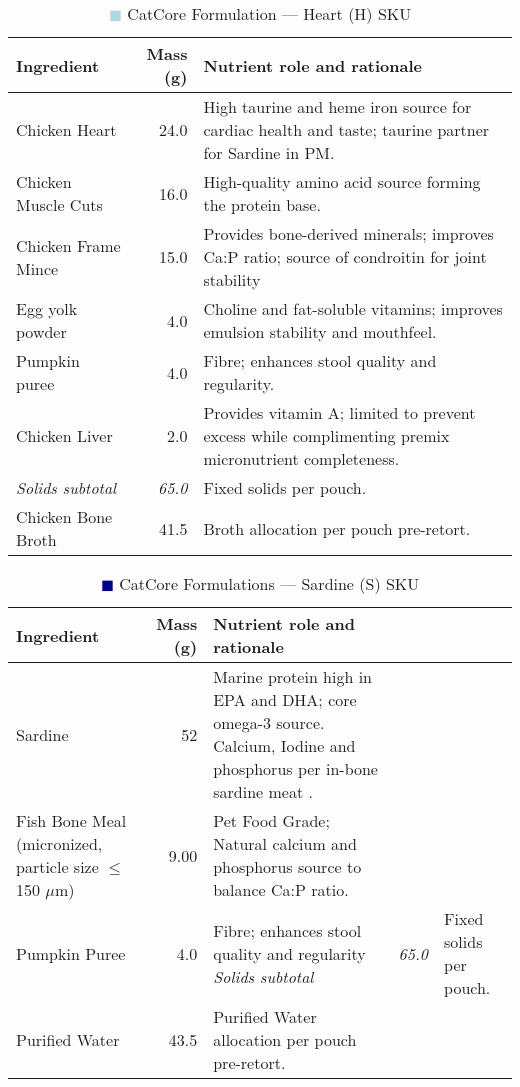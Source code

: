 \begin{table}[htbp]
\centering
\caption{\textcolor{lightblue}{$\blacksquare$} CatCore Formulation ---  Heart (H) SKU}
\label{tab:heart_sku_3col}
\begin{adjustbox}{max width=\textwidth}
\begin{tabular}{@{}l r p{8.0cm}@{}}
\toprule
\textbf{Ingredient} & \textbf{Mass (g)} & \textbf{Nutrient role and rationale} \\
\midrule
Chicken Heart & 24.0 & High taurine and heme iron source for cardiac health and taste; taurine partner for Sardine in PM. \\[3pt]
Chicken Muscle Cuts & 16.0 & High-quality amino acid source forming the protein base. \\[3pt]
Chicken Frame Mince & 15.0 & Provides bone-derived minerals; improves Ca:P ratio; source of condroitin for joint stability \\[3pt]
Egg yolk powder & 4.0 & Choline and fat-soluble vitamins; improves emulsion stability and mouthfeel. \\[3pt]
Pumpkin puree & 4.0 & Fibre; enhances stool quality and regularity. \\[3pt]
Chicken Liver & 2.0 & Provides vitamin A; limited to prevent excess while complimenting premix micronutrient completeness. \\[3pt]
\textit{Solids subtotal} & \textit{65.0} & Fixed solids per pouch. \\[3pt]
Chicken Bone Broth & 41.5 & Broth allocation per pouch pre-retort. \\[3pt]
\bottomrule
\end{tabular}
\end{adjustbox}
\end{table}

\begin{table}[htbp]
\centering
\caption{\textcolor{darkblue}{$\blacksquare$} CatCore Formulations --- Sardine (S) SKU}
\label{tab:sardine_sku_3col_mod}
\begin{adjustbox}{max width=\textwidth}
\begin{tabular}{@{}l r p{8.0cm}@{}}
\toprule
\textbf{Ingredient} & \textbf{Mass (g)} & \textbf{Nutrient role and rationale} \\
\midrule
Sardine & 52 & Marine protein high in EPA and DHA; core omega-3 source. Calcium, Iodine and phosphorus per in-bone sardine meat \cite{sardinecap}. \\[3pt]
Fish Bone Meal (micronized, particle size $\le$ 150 $\mu$m) & 9.00 & Pet Food Grade; Natural calcium and phosphorus source to balance Ca:P ratio. \\[3pt]
Pumpkin Puree & 4.0 & Fibre; enhances stool quality and regularity
\textit{Solids subtotal} & \textit{65.0} & Fixed solids per pouch. \\[3pt]
Purified Water & 43.5 & Purified Water allocation per pouch pre-retort. \\[3pt]
\bottomrule
\end{tabular}
\end{adjustbox}
\end{table}

